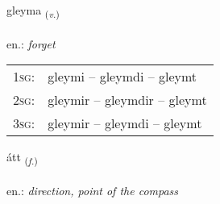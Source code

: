 \documentclass[frontgrid, backgrid]{flacards}\usepackage[]{graphicx}\usepackage[]{xcolor}
\begin{document}
\renewcommand{\flhead}{\vskip5pt \fboxsep=0pt {\small\bfseries\footnotesize Sagnorð | Verb}}
\renewcommand{\fcfoot}{\vskip5pt \fboxsep=0pt \hspace{2pt}{\small\bfseries\footnotesize 1K}}

\renewcommand{\blhead}{\vskip5pt {\small\bfseries\footnotesize Sagnorð | Verb }}
\renewcommand{\bcfoot}{\vskip5pt \hspace{2pt}{\small\bfseries\footnotesize 1K}}


{gleyma \small{\textsubscript{(\textit{v.})}} \\[1ex] %
\textphonetic{[kleiːma]} \\
en.: \emph{forget} \\  [2ex]
\renewcommand*{\arraystretch}{0.8}
\begin{tabular}{p{1cm}l}
\textsc{1sg}: & gleymi -- gleymdi -- gleymt \\ 
\textsc{2sg}: & gleymir -- gleymdir -- gleymt \\ 
\textsc{3sg}: & gleymir -- gleymdi -- gleymt \\ 
\end{tabular}
}

\renewcommand{\flhead}{\vskip5pt \fboxsep=0pt {\small\bfseries\footnotesize Nafnorð | Noun}}
\renewcommand{\fcfoot}{\vskip5pt \fboxsep=0pt \hspace{2pt}{\small\bfseries\footnotesize 1K}}

\renewcommand{\blhead}{\vskip5pt {\small\bfseries\footnotesize Nafnorð | Noun }}
\renewcommand{\bcfoot}{\vskip5pt \hspace{2pt}{\small\bfseries\footnotesize 1K}}


{átt \small{\textsubscript{(\textit{f.})}} \\[1ex] %
\textphonetic{[auht]} \\
en.: \emph{direction, point of the compass} \\  [2ex]
\renewcommand*{\arraystretch}{0.8}
}
\end{document}
